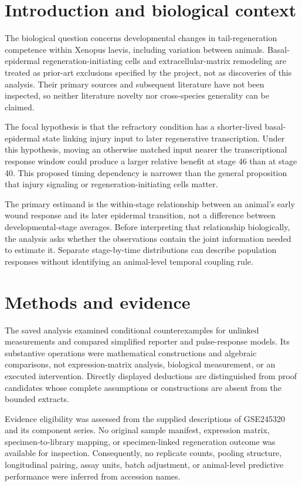 \documentclass[11pt]{article}
\begin{document}
\section{Introduction and biological context}
The biological question concerns developmental changes in tail-regeneration competence within Xenopus laevis, including variation between animals. Basal-epidermal regeneration-initiating cells and extracellular-matrix remodeling are treated as prior-art exclusions specified by the project, not as discoveries of this analysis. Their primary sources and subsequent literature have not been inspected, so neither literature novelty nor cross-species generality can be claimed.

The focal hypothesis is that the refractory condition has a shorter-lived basal-epidermal state linking injury input to later regenerative transcription. Under this hypothesis, moving an otherwise matched input nearer the transcriptional response window could produce a larger relative benefit at stage 46 than at stage 40. This proposed timing dependency is narrower than the general proposition that injury signaling or regeneration-initiating cells matter.

The primary estimand is the within-stage relationship between an animal's early wound response and its later epidermal transition, not a difference between developmental-stage averages. Before interpreting that relationship biologically, the analysis asks whether the observations contain the joint information needed to estimate it. Separate stage-by-time distributions can describe population responses without identifying an animal-level temporal coupling rule.

\section{Methods and evidence}
The saved analysis examined conditional counterexamples for unlinked measurements and compared simplified reporter and pulse-response models. Its substantive operations were mathematical constructions and algebraic comparisons, not expression-matrix analysis, biological measurement, or an executed intervention. Directly displayed deductions are distinguished from proof candidates whose complete assumptions or constructions are absent from the bounded extracts.

Evidence eligibility was assessed from the supplied descriptions of GSE245320 and its component series. No original sample manifest, expression matrix, specimen-to-library mapping, or specimen-linked regeneration outcome was available for inspection. Consequently, no replicate counts, pooling structure, longitudinal pairing, assay units, batch adjustment, or animal-level predictive performance were inferred from accession names.
\end{document}
